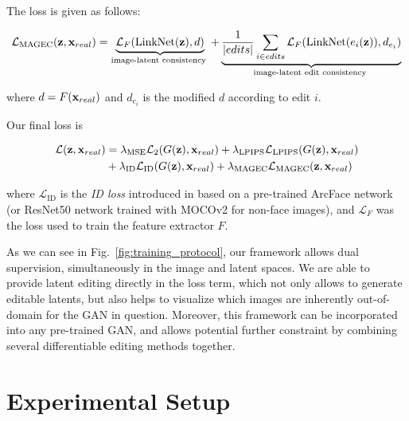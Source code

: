 The \magec loss is given as follows:

\begin{equation}\label{MAGEC}
    \mathcal{L}_{\text{MAGEC}}(\z, \x_{real}) = \underbrace{\mathcal{L}_F(\linknet(\z), d)}_{\text{image-latent consistency  %
    }} 
    + 
    \underbrace{\frac{1}{|edits|} \sum_{i \in edits}{\mathcal{L}_F(\linknet(e_i(\z)), d_{e_i})}}_{\text{image-latent edit consistency %
    }}
\end{equation}

where $d = F(\mathbf{x}_{real})$ and $d_{e_i}$ is the modified $d$ according to edit $i$.

Our final loss is

\begin{equation}\label{final_loss_term} \begin{split}
\mathcal{L}(\mathbf{z}, \mathbf{x}_{real}) &= \lambda_{\text{MSE}}\mathcal{L}_2(G(\mathbf{z}), \mathbf{x}_{real}) + \lambda_{\text{LPIPS}}\mathcal{L}_{\text{LPIPS}}(G(\mathbf{z}), \mathbf{x}_{real}) \\&+ \lambda_{\text{ID}}\mathcal{L}_{\text{ID}}(G(\mathbf{z}), \mathbf{x}_{real}) +  \lambda_{\text{MAGEC}}\mathcal{L}_{\text{MAGEC}}(\mathbf{z}, \mathbf{x}_{real})
\end{split} \end{equation}


\noindent where $\mathcal{L}_{\text{ID}}$ is the \emph{ID loss} introduced
 in  \cite{psp, e4e}
 based on a pre-trained ArcFace \citep{deng2018arcface} network 
 (or ResNet50 \citep{he2016resnet} network trained with MOCOv2  
 \citep{mocov2_paper} for non-face images), and $\mathcal{L}_{F}$ was the loss 
 used to train the feature extractor $F$.

As we can see in Fig.~\ref{fig:training_protocol}, our framework allows dual 
supervision, simultaneously in the image and latent spaces. We are able to
 provide latent editing directly in the loss term, which not only allows to 
 generate editable latents, but also helps to visualize which images are 
 inherently out-of-domain for the GAN in question. Moreover, this framework 
 can be incorporated into any pre-trained GAN, and allows potential further 
 constraint by combining several differentiable editing methods together.

\section{Experimental Setup}


